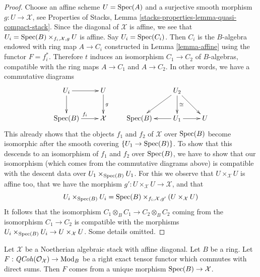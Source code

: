 \begin{proof}
Choose an affine scheme $U = \mathop{\mathrm{Spec}}(A)$ and a surjective smooth
morphism $g : U \to \mathcal{X}$, see
Properties of Stacks, Lemma \ref{stacks-properties-lemma-quasi-compact-stack}.
Since the diagonal of $\mathcal{X}$ is affine, we see that
$U_i = \mathop{\mathrm{Spec}}(B) \times_{f_i, \mathcal{X}, g} U$ is affine.
Say $U_i = \mathop{\mathrm{Spec}}(C_i)$. Then $C_i$ is the $B$-algebra endowed
with ring map $A \to C_i$ constructed in Lemma \ref{lemma-affine}
using the functor $F = f_i^*$. Therefore $t$ induces an isomorphism
$C_1 \to C_2$ of $B$-algebras, compatible with the ring maps
$A \to C_1$ and $A \to C_2$. In other words, we have a commutative
diagrams
$$
\xymatrix{
U_i \ar[r] \ar[d] & U \ar[d]^g \\
\Spec(B) \ar[r]^{f_i} & \mathcal{X}
}
\quad\quad
\xymatrix{
&
U_2 \ar[ld] \ar[d]^{\cong} \ar[rd] \\
\Spec(B) &
U_1 \ar[l] \ar[r] &
U
}
$$
This already shows that the objects $f_1$ and $f_2$ of $\mathcal{X}$
over $\mathop{\mathrm{Spec}}(B)$ become isomorphic after the smooth covering
$\{U_1 \to \mathop{\mathrm{Spec}}(B)\}$. To show that this descends to an isomorphism
of $f_1$ and $f_2$ over $\mathop{\mathrm{Spec}}(B)$, we have to show that our isomorphism
(which comes from the commutative diagrams above) is compatible
with the descent data over $U_1 \times_{\mathop{\mathrm{Spec}}(B)} U_1$. For this
we observe that $U \times_\mathcal{X} U$ is affine too, that
we have the morphism $g' : U \times_\mathcal{X} U \to \mathcal{X}$, and
that
$$
U_i \times_{\mathop{\mathrm{Spec}}(B)} U_i =
\mathop{\mathrm{Spec}}(B) \times_{f_i, \mathcal{X}, g'}
(U \times_\mathcal{X} U)
$$
It follows that the isomorphism $C_1 \otimes_B C_1 \to C_2 \otimes_B C_2$
coming from the isomorphism $C_1 \to C_2$ is compatible with the
morphisms $U_i \times_{\mathop{\mathrm{Spec}}(B)} U_i \to U \times_\mathcal{X} U$.
Some details omitted.
\end{proof}

\begin{lemma}
\label{lemma-main}
Let $\mathcal{X}$ be a Noetherian algebraic stack with affine diagonal.
Let $B$ be a ring.
Let $F : \mathit{QCoh}(\mathcal{O}_\mathcal{X}) \to \text{Mod}_B$
be a right exact tensor functor which commutes with direct sums.
Then $F$ comes from a unique morphism $\mathop{\mathrm{Spec}}(B) \to \mathcal{X}$.
\end{lemma}


